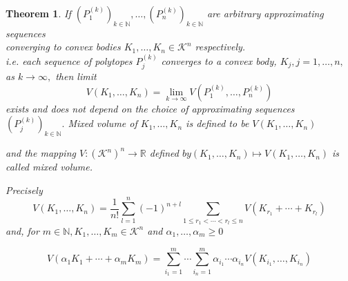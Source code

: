 \documentclass[oneside]{book}
\newtheorem{theorem}{Theorem}[section]
\begin{document}
	\begin{theorem}
		\label{t:10}
		If $\left(P_{1}^{(k)}\right)_{k \in \mathbb{N}}, \ldots,\left(P_{n}^{(k)}\right)_{k \in \mathbb{N}}$ are arbitrary approximating sequences\\
		
		converging to convex bodies  $K_{1}, \ldots, K_{n} \in \mathcal{K}^{n}$ respectively.
		\\
		i.e. each sequence of polytopes $P_{j}^{(k)}$ converges to a convex body, 
		$K_{j}, j=1, \ldots, n,$ as $k \rightarrow \infty,$ 
		then limit 
		\begin{equation}
		\label{eq51}
		V\left(K_{1}, \ldots, K_{n}\right)=\lim _{k \rightarrow \infty} V\left(P_{1}^{(k)}, \ldots, P_{n}^{(k)}\right)
		\end{equation}
		exists and does not depend on the choice of approximating sequences $\left(P_{j}^{(k)}\right)_{k \in \mathbb{N}}. $ \newline
		Mixed volume of $K_{1}, \ldots, K_{n} $ is defined to be $V\left(K_{1}, \ldots, K_{n}\right)$ \newline
		
		and the mapping $V:\left(\mathcal{K}^{n}\right)^{n} \rightarrow \mathbb{R}$ defined $b y\left(K_{1}, \ldots, K_{n}\right) \mapsto V\left(K_{1}, \ldots, K_{n}\right)$ is called mixed volume.\newline
		
		Precisely 
		\begin{equation} 
		\label{eq52}
		V\left(K_{1}, \ldots, K_{n}\right)=\frac{1}{n !} \sum_{l=1}^{n}(-1)^{n+l} \sum_{1 \leq r_{1}<\cdots<r_{l} \leq n} V\left(K_{r_{1}}+\cdots+K_{r_{l}}\right)
		\end{equation}
		and, for $m \in \mathbb{N}, K_{1}, \ldots, K_{m} \in \mathcal{K}^{n}$ and $\alpha_{1}, \ldots, \alpha_{m} \geq 0$
		
		
		\begin{equation}
		\label{eq53}
		V\left(\alpha_{1} K_{1}+\cdots+\alpha_{m} K_{m}\right)=\sum_{i_{1}=1}^{m} \cdots \sum_{i_{n}=1}^{m} \alpha_{i_{1}} \cdots \alpha_{i_{n}} V\left(K_{i_{1}}, \ldots, K_{i_{n}}\right)
		\end{equation}
	\end{theorem}
	
\end{document}
